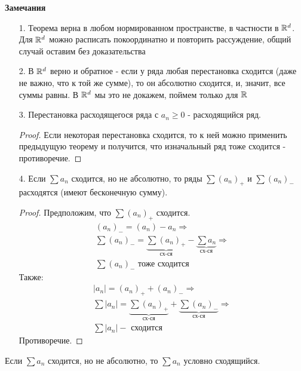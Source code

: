 \textbf{Замечания}
\begin{enumerate}
    \item[1.] Теорема верна в любом нормированном пространстве, в частности в $\mathbb{R}^d$.
    Для $\mathbb{R}^d$ можно расписать покоординатно и повторить рассуждение, общий случай оставим без доказательства
    \item[2.] В $\mathbb{R}^d$ верно и обратное - если у ряда любая перестановка сходится (даже не важно, что к той же сумме), то он абсолютно сходится,
    и, значит, все суммы равны. В $\mathbb{R}^d$ мы это не докажем, поймем только для $\mathbb{R}$
    \item[3.] Перестановка расходящегося ряда с $a_n \geq 0$ - расходящийся ряд.
    \begin{proof}
        Если некоторая перестановка сходится, то к ней можно применить предыдущую теорему и получится, что изначальный ряд тоже сходится - противоречие.
    \end{proof} 
    \item[4.] Если $\sum a_n$ сходится, но не абсолютно, то ряды $\sum (a_n)_+$ и $\sum (a_n)_-$ расходятся (имеют бесконечную сумму).  
    \begin{proof}
        Предположим, что $\sum(a_n)_+$ сходится. 
        \begin{gather*}
            (a_n)_- = (a_n) - a_n \Longrightarrow \\
            \sum (a_n)_- = \underbrace{\sum (a_n)_+}_{\text{сх-ся}} - \underbrace{\sum a_n}_{\text{сх-ся}} \Longrightarrow \\
            \sum(a_n)_- \text{ тоже сходится}
        \end{gather*}
        Также:
        \begin{gather*}
            |a_n| = (a_n)_+ + (a_n)_- \Longrightarrow \\ 
            \sum |a_n| = \underbrace{\sum (a_n)_+}_{\text{сх-ся}} + \underbrace{\sum (a_n)_-}_{\text{сх-ся}} \Longrightarrow \\
            \sum |a_n| - \text{ сходится}
        \end{gather*}
        Противоречие.
    \end{proof}
\end{enumerate}

\begin{conj}
    Если $\sum a_n$ сходится, но не абсолютно, то $\sum a_n$ условно сходящийся.
\end{conj}

